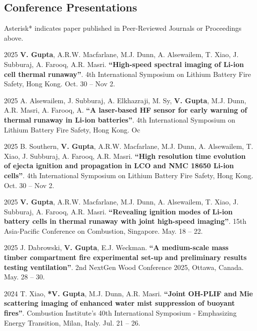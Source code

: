 \documentclass[12pt,letterpaper]{report}
\begin{document}
\subsection*{Conference Presentations}

 Asterisk* indicates paper published in Peer-Reviewed Journals or Proceedings above. \bigskip

    \begin{tablist}
         \item[2025] \tab \textbf{V. Gupta}, A.R.W. Macfarlane, M.J. Dunn, A. Alsewailem, T. Xiao, J. Subburaj, A. Farooq, A.R. Masri. \textbf{\enquote{\textbf{High-speed spectral imaging of Li-ion cell thermal runaway}}}. 4th International Symposium on Lithium Battery Fire Safety, Hong Kong. Oct. 30 -- Nov 2.

         \item[2025] \tab A. Alsewailem, J. Subburaj, A. Elkhazraji, M. Sy, \textbf{V. Gupta}, M.J. Dunn, A.R. Masri, A. Farooq, A. \textbf{\enquote{\textbf{A laser-based HF sensor for early warning of thermal runaway in Li-ion batteries}}}. 4th International Symposium on Lithium Battery Fire Safety, Hong Kong. Oc

         \item[2025] \tab B. Southern, \textbf{V. Gupta}, A.R.W. Macfarlane, M.J. Dunn, A. Alsewailem, T. Xiao, J. Subburaj, A. Farooq, A.R. Masri. \textbf{\enquote{\textbf{High resolution time evolution of ejecta ignition and propagation in LCO and NMC 18650 Li-ion cells}}}. 4th International Symposium on Lithium Battery Fire Safety, Hong Kong. Oct. 30 -- Nov 2.

         \item[2025] \tab \textbf{V. Gupta}, A.R.W. Macfarlane, M.J. Dunn, A. Alsewailem, T. Xiao, J. Subburaj, A. Farooq, A.R. Masri. \textbf{\enquote{\textbf{Revealing ignition modes of Li-ion battery cells in thermal runaway with joint high-speed imaging}}}. 15th Asia-Pacific Conference on Combustion, Singapore. May. 18 -- 22.

         \item[2025] \tab J. Dabrowski, \textbf{V. Gupta}, E.J. Weckman. \textbf{\enquote{\textbf{A medium-scale mass timber compartment fire experimental set-up and preliminary results testing ventilation}}}. 2nd NextGen Wood Conference 2025, Ottawa, Canada. May. 28 -- 30.

        \item[2024] \tab T. Xiao, \textbf{*V. Gupta}, M.J. Dunn, A.R. Masri. \textbf{\enquote{\textbf{Joint OH-PLIF and Mie scattering imaging of enhanced water mist suppression of buoyant fires}}}. Combustion Institute's 40th International Symposium - Emphasizing Energy Transition, Milan, Italy. Jul. 21 -- 26.


\end{tablist}
\end{document}
